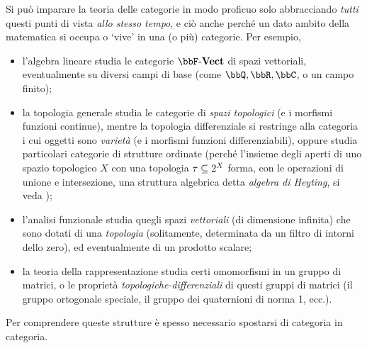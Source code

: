 Si può imparare la teoria delle categorie in modo proficuo solo abbracciando \emph{tutti} questi punti di vista \emph{allo stesso tempo}, e ciò anche perché un dato ambito della matematica si occupa o `vive' in una (o più) categorie. Per esempio,
\begin{itemize}
	\item l'algebra lineare studia le categorie \(\ctVect\) di spazi vettoriali, eventualmente su diversi campi di base (come \(\bbQ,\bbR,\bbC\), o un campo finito);
	\item la topologia generale studia le categorie di \emph{spazi topologici} (e i morfismi funzioni continue), mentre la topologia differenziale si restringe alla categoria i cui oggetti sono \emph{varietà} (e i morfismi funzioni differenziabili), oppure studia particolari categorie di strutture ordinate (perché l'insieme degli aperti di uno spazio topologico \(X\) con una topologia \(\tau \subseteq 2^{X}\) forma, con le operazioni di unione e intersezione, una struttura algebrica detta \emph{algebra di Heyting}, si veda \cite{Esakia2019});
	\item l'analisi funzionale studia quegli spazi \emph{vettoriali} (di dimensione infinita) che sono dotati di una \emph{topologia} (solitamente, determinata da un filtro di intorni dello zero), ed eventualmente di un prodotto scalare;
	\item la teoria della rappresentazione studia certi omomorfismi in un gruppo di matrici, o le proprietà \emph{topologiche-differenziali} di questi gruppi di matrici (il gruppo ortogonale speciale, il gruppo dei quaternioni di norma 1, ecc.).
\end{itemize}
Per comprendere queste strutture è spesso necessario spostarsi di categoria in categoria.

